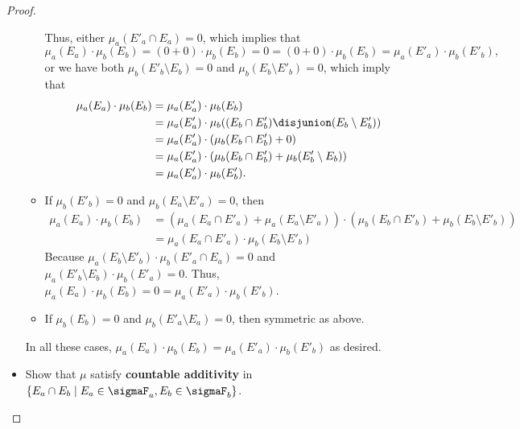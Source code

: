 \begin{proof}
\begin{itemize}
\begin{itemize}
       Thus,  either $\mu_a(E'_a \cap E_a) = 0$, which implies that
       \[
        \mu_a(E_a) \cdot \mu_b(E_b)  = (0 + 0) \cdot  \mu_b(E_b) = 0 =(0+0) \cdot \mu_b(E_b) = \mu_a(E'_a) \cdot \mu_b(E'_b),
       \]
       or we have both $\mu_b(E'_b \setminus E_b) = 0$ and $\mu_b(E_b \setminus E'_b) = 0$, which imply that
       \begin{align*}
        \mu_a(E_a) \cdot \mu_b(E_b)
          &= \mu_a(E'_a) \cdot \mu_b(E_b)\\
          &= \mu_a(E'_a) \cdot \mu_b((E_b \cap E'_b ) \disjunion (E_b \setminus E'_b)) \\
          &= \mu_a(E'_a) \cdot (\mu_b(E_b \cap E'_b ) + 0) \\
          &= \mu_a(E'_a) \cdot (\mu_b(E_b \cap E'_b ) + \mu_b(E'_b \setminus E_b)) \\
          &= \mu_a(E'_a) \cdot \mu_b(E'_b ).
       \end{align*}
       \item If $\mu_b(E'_b) = 0$ and $\mu_b(E_a \setminus E'_a) = 0$,
        then
        \begin{align*}
         \mu_a(E_a) \cdot \mu_b(E_b)
         &= (\mu_a(E_a \cap E'_a) + \mu_a(E_a \setminus E'_a)) \cdot (\mu_b(E_b \cap E'_b) + \mu_b(E_b \setminus E'_b)) \\
         &= \mu_a(E_a \cap E'_a)  \cdot \mu_b(E_b \setminus E'_b)
        \end{align*}
Because $\mu_a(E_b \setminus E'_b) \cdot \mu_b(E'_a \cap E_a) = 0$ and
     $\mu_a(E'_b \setminus E_b) \cdot \mu_b(E'_a) = 0$.
        Thus, $\mu_a(E_a) \cdot \mu_b(E_b) =0 = \mu_a(E'_a) \cdot \mu_b(E'_b)$.

       \item If $\mu_b(E_b) = 0$ and $\mu_b(E'_a \setminus E_a) = 0$,
        then symmetric as above.

     \end{itemize}

     In all these cases,
     $\mu_a(E_a) \cdot \mu_b(E_b) = \mu_a(E'_a) \cdot \mu_b(E'_b)$ as desired.

    \item Show that $\mu$ satisfy \textbf{countable additivity} in $\{E_a \cap E_b \mid E_a \in \sigmaF_a,
   E_b \in  \sigmaF_b\}$.


\end{itemize}
\end{proof}
